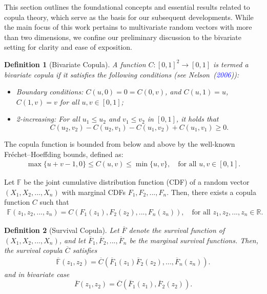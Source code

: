 \documentclass[12pt, a4paper]{article}
\numberwithin{equation}{section}
\newtheorem{definition}{Definition}[section]
\begin{document}
This section outlines the foundational concepts and essential results related to copula theory, which serve as the basis for our subsequent developments. While the main focus of this work pertains to multivariate random vectors with more than two dimensions, we confine our preliminary discussion to the bivariate setting for clarity and ease of exposition.

\begin{definition}[Bivariate Copula]
	A function $C: [0,1]^2 \rightarrow [0,1]$ is termed a bivariate copula if it satisfies the following conditions (see Nelson~(\textcolor{blue}{2006})):
	\begin{itemize}
		\item Boundary conditions: $C(u,0) = 0 = C(0,v)$, and $C(u,1) = u$, $C(1,v) = v$ for all $u, v \in [0,1]$;
		\item 2-increasing: For all $u_1 \le u_2$ and $v_1 \le v_2$ in $[0,1]$, it holds that
		\[
		C(u_2,v_2) - C(u_2,v_1) - C(u_1,v_2) + C(u_1,v_1) \geq 0.
		\]
	\end{itemize}
\end{definition}

The copula function is bounded from below and above by the well-known Fr\'echet–Hoeffding bounds, defined as:
\begin{align}\label{eqn2.1}
	\max\{u + v - 1, 0\} \leq C(u,v) \leq \min\{u,v\}, \quad \text{for all } u, v \in [0,1].
\end{align}

\begin{theorem}
	Let $\mathbb F$ be the joint cumulative distribution function (CDF) of a random vector $(X_1,X_2,...,X_n)$ with marginal CDFs $F_1,F_2,...,F_n$. Then, there exists a copula function $C$ such that
	\begin{align}\label{eq:sklar}
		\mathbb F(z_1,z_2,...,z_n) = C(F_1(z_1), F_2(z_2),...,F_n(z_n)), \quad \text{for all } z_1, z_2,...,z_n \in \mathbb{R}.
	\end{align}
\end{theorem}

\begin{definition}[Survival Copula]
	Let $\overline{F}$ denote the survival function of $(X_1,X_2,...,X_n)$, and let $\overline{F}_1, \overline{F}_2,...,\overline{F}_n$ be the marginal survival functions. Then, the survival copula $\overline{C}$ satisfies
	\begin{align}\label{eq:survival}
		\overline{\mathbb F}(z_1,z_2) = \overline{C}(\overline{F}_1(z_1) \overline{F}_2(z_2),...,\overline{F}_n(z_n)).
	\end{align} and in bivariate case
	$$	\overline{F}(z_1,z_2) = \overline{C}(\overline{F}_1(z_1), \overline{F}_2(z_2)).$$
\end{definition}
\end{document}
